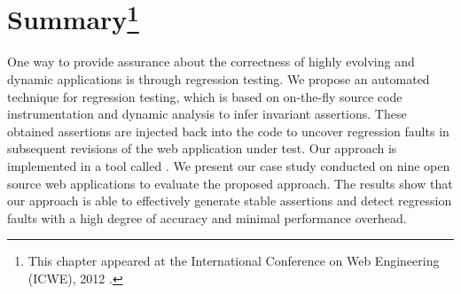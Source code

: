 \section*{Summary\footnote{This chapter appeared at the International Conference on Web Engineering (ICWE), 2012 \cite{mirshokraie:icwe12}.}}
One way to provide assurance about the correctness of highly evolving and dynamic applications is through regression testing. We propose an automated technique for \javascript regression testing, which is based on on-the-fly \javascript source code instrumentation and dynamic analysis to infer invariant assertions. These obtained assertions are injected back into the \javascript code to uncover regression faults in subsequent revisions of the web application under test.
Our approach is implemented in a tool called \jsart. We present our case study conducted on nine open source web applications to evaluate the proposed approach. The results show that our approach is able to effectively generate stable assertions and detect \javascript regression faults with a high degree of accuracy and minimal performance overhead.



